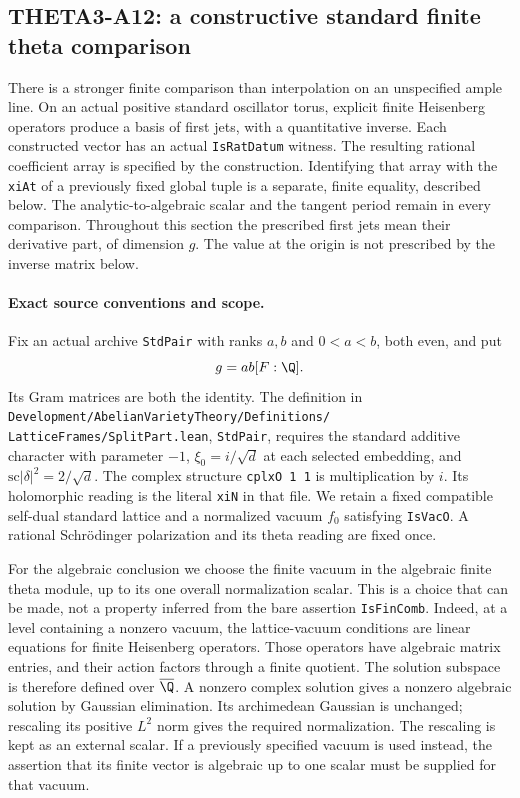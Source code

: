 \subsection{THETA3-A12: a constructive standard finite theta comparison}
\label{A12}

There is a stronger finite comparison than interpolation on an
unspecified ample line.  On an actual positive standard oscillator
torus, explicit finite Heisenberg operators produce a basis of first
jets, with a quantitative inverse.  Each constructed vector has an
actual \texttt{IsRatDatum} witness.  The resulting rational coefficient
array is specified by the construction.  Identifying that array with
the \texttt{xiAt} of a previously fixed global tuple is a separate,
finite equality, described below.  The analytic-to-algebraic scalar
and the tangent period remain in every comparison.
Throughout this section the prescribed first jets mean
their derivative part, of dimension $g$.  The value at
the origin is not prescribed by the inverse matrix below.

\paragraph{Exact source conventions and scope.}
Fix an actual archive \texttt{StdPair} with ranks $a,b$ and
$0<a<b$, both even, and put
\[
                  g=ab[F:\Q].
\]
Its Gram matrices are both the identity.  The definition in
\texttt{Development/AbelianVarietyTheory/Definitions/}
\texttt{LatticeFrames/SplitPart.lean}, \texttt{StdPair}, requires
the standard additive character with parameter $-1$,
$\xi_0=i/\sqrt d$ at each selected embedding, and
$\mathrm{sc}|\delta|^2=2/\sqrt d$.  The complex structure
\texttt{cplxO 1 1} is multiplication by $i$.  Its holomorphic
reading is the literal \texttt{xiN} in that file.  We retain a
fixed compatible self-dual standard lattice and a normalized
vacuum $f_0$ satisfying \texttt{IsVacO}.  A rational Schr\"odinger
polarization and its theta reading are fixed once.

For the algebraic conclusion we choose the finite vacuum in the
algebraic finite theta module, up to its one overall normalization
scalar.  This is a choice that can be made, not a property inferred
from the bare assertion \texttt{IsFinComb}.  Indeed, at a level
containing a nonzero vacuum, the lattice-vacuum conditions are
linear equations for finite Heisenberg operators.  Those operators
have algebraic matrix entries, and their action factors through a
finite quotient.  The solution subspace is therefore defined over
$\overline\Q$.  A nonzero complex solution gives a nonzero
algebraic solution by Gaussian elimination.  Its archimedean
Gaussian is unchanged; rescaling its positive $L^2$ norm gives
the required normalization.  The rescaling is kept as an external
scalar.  If a previously specified vacuum is used instead, the
assertion that its finite vector is algebraic up to one scalar
must be supplied for that vacuum.

